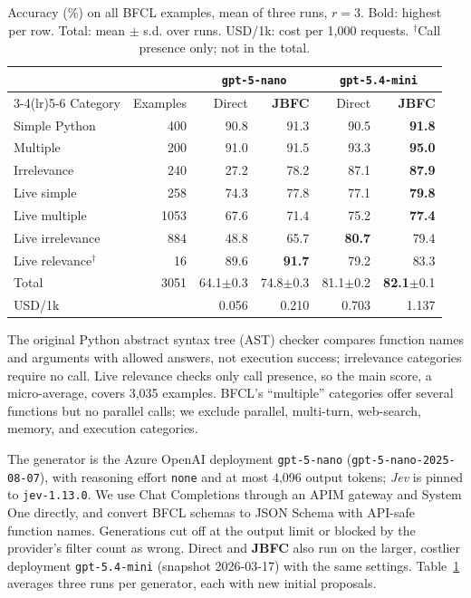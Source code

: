 \documentclass[10pt,twocolumn,letterpaper]{article}
\makeatletter
\renewcommand{\subsection}{\@startsection{subsection}{2}{\z@}{2.25ex \@plus 1ex \@minus .2ex}{1ex \@plus .2ex}{\normalfont\large\bfseries}}
\makeatother
\begin{document}
\begin{table}[t]
\centering\footnotesize
\setlength{\tabcolsep}{4pt}
\begin{tabular}{lrrrrr}
\toprule
 & & \multicolumn{2}{c}{\texttt{gpt-5-nano}} & \multicolumn{2}{c}{\texttt{gpt-5.4-mini}}\\
\cmidrule(lr){3-4}\cmidrule(lr){5-6}
Category & Examples & Direct & \textbf{JBFC} & Direct & \textbf{JBFC}\\
\midrule
Simple Python & 400 & 90.8 & 91.3 & 90.5 & \textbf{91.8}\\
Multiple & 200 & 91.0 & 91.5 & 93.3 & \textbf{95.0}\\
Irrelevance & 240 & 27.2 & 78.2 & 87.1 & \textbf{87.9}\\
Live simple & 258 & 74.3 & 77.8 & 77.1 & \textbf{79.8}\\
Live multiple & 1053 & 67.6 & 71.4 & 75.2 & \textbf{77.4}\\
Live irrelevance & 884 & 48.8 & 65.7 & \textbf{80.7} & 79.4\\
Live relevance$^\dagger$ & 16 & 89.6 & \textbf{91.7} & 79.2 & 83.3\\
\midrule
Total & 3051 & 64.1{\scriptsize$\pm$0.3} & 74.8{\scriptsize$\pm$0.3} & 81.1{\scriptsize$\pm$0.2} & \textbf{82.1}{\scriptsize$\pm$0.1}\\
USD/1k & & 0.056 & 0.210 & 0.703 & 1.137\\
\bottomrule
\end{tabular}
\caption{Accuracy (\%) on all BFCL examples, mean of three runs, $r=3$. Bold: highest per row. Total: mean $\pm$ s.d. over runs. USD/1k: cost per 1,000 requests. $^\dagger$Call presence only; not in the total.}
\label{tab:categories}
\end{table}

The original Python abstract syntax tree (AST) checker compares function names and arguments with allowed answers, not execution success; irrelevance categories require no call. Live relevance checks only call presence, so the main score, a micro-average, covers 3,035 examples. BFCL's ``multiple'' categories offer several functions but no parallel calls; we exclude parallel, multi-turn, web-search, memory, and execution categories.

\subsection{Models and Methods}
The generator is the Azure OpenAI deployment \texttt{gpt-5-nano} (\texttt{gpt-5-nano-2025-08-07}), with reasoning effort \texttt{none} and at most 4,096 output tokens; \textit{Jev} is pinned to \texttt{jev-1.13.0}. We use Chat Completions through an APIM gateway and System One directly, and convert BFCL schemas to JSON Schema with API-safe function names. Generations cut off at the output limit or blocked by the provider's filter count as wrong. Direct and \textbf{JBFC} also run on the larger, costlier deployment \texttt{gpt-5.4-mini} (snapshot 2026-03-17) with the same settings. Table~\ref{tab:categories} averages three runs per generator, each with new initial proposals.
\end{document}
